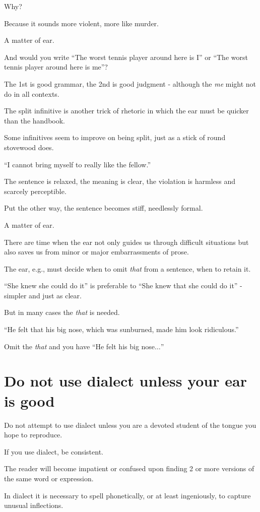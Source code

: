 \documentclass{book}
\numberwithin{equation}{section}
\begin{document}
Why?

Because it sounds more violent, more like murder.

A matter of ear.

%
And would you write ``The worst tennis player around here is I'' or ``The worst tennis player around here is me''?

The 1st is good grammar, the 2nd is good judgment - although the \textit{me} might not do in all contexts.

%
The split infinitive is another trick of rhetoric in which the ear must be quicker than the handbook.

Some infinitives seem to improve on being split, just as a stick of round stovewood does.

``I cannot bring myself to really like the fellow.''

The sentence is relaxed, the meaning is clear, the violation is harmless and scarcely perceptible.

Put the other way, the sentence becomes stiff, needlessly formal.

A matter of ear.

%
There are time when the ear not only guides us through difficult situations but also saves us from minor or major embarrassments of prose.

The ear, e.g., must decide when to omit \textit{that} from a sentence, when to retain it.

``She knew she could do it'' is preferable to ``She knew that she could do it'' - simpler and just as clear.

But in many cases the \textit{that} is needed.

``He felt that his big nose, which was sunburned, made him look ridiculous.''

Omit the \textit{that} and you have ``He felt his big nose$\ldots$''

\section{Do not use dialect unless your ear is good}
Do not attempt to use dialect unless you are a devoted student of the tongue you hope to reproduce.

If you use dialect, be consistent.

The reader will become impatient or confused upon finding 2 or more versions of the same word or expression.

In dialect it is necessary to spell phonetically, or at least ingeniously, to capture unusual inflections.
\end{document}
